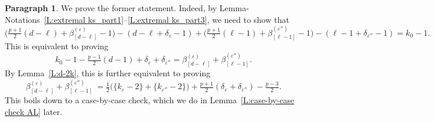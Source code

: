 \documentclass[12pt]{amsart}
\theoremstyle{definition}
\newtheorem{para}[subsection]{Paragraph}
\numberwithin{equation}{subsection}
\begin{document}
\begin{para}
\label{P:para_138}
We prove the former statement. Indeed, by Lemma-Notations~\ref{L:extremal ks_part1}--\ref{L:extremal ks_part3}, we need to show that
$$
\big(\tfrac{p+1}2 (d-\ell) + \beta_{[d-\ell]}^{(\varepsilon)}-1\big) - (d-\ell + \delta_\varepsilon -1)  + \big(\tfrac{p+1}2 (\ell-1) + \beta_{[\ell-1]}^{(\varepsilon'')}-1\big) - (\ell-1 + \delta_{\varepsilon''} -1)=k_0-1.
$$
This is equivalent to proving
$$
k_0-1-\tfrac{p-1}2 (d-1) +\delta_\varepsilon + \delta_{\varepsilon''} = \beta_{[d-\ell]}^{(\varepsilon)} + \beta_{[\ell-1]}^{(\varepsilon'')}.
$$
By Lemma~\ref{L:d-2k}, this is further equivalent to proving
$$
\beta_{[d-\ell]}^{(\varepsilon)} + \beta_{[\ell-1]}^{(\varepsilon'')} \ =\tfrac12\big(\{k_\varepsilon - 2\} + \{k_{\varepsilon''}-2\} \big)  + \tfrac{p+1}2 (\delta_\varepsilon + \delta_{\varepsilon''}) -\tfrac{p-3}2.
$$
This boils down to a case-by-case check, which we do in Lemma~\ref{L:case-by-case check AL} later.
\end{para}
\end{document}
